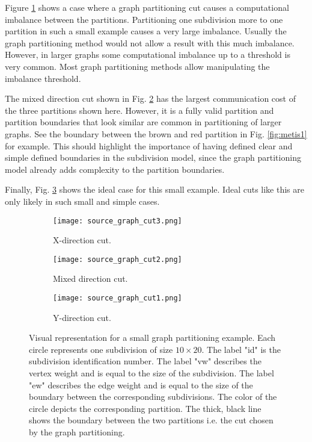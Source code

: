 Figure \ref{fig:cut1} shows a case where a graph partitioning cut causes a computational imbalance between the partitions.
Partitioning one subdivision more to one partition in such a small example causes a very large imbalance.
Usually the graph partitioning method would not allow a result with this much imbalance.
However, in larger graphs some computational imbalance up to a threshold is very common.
Most graph partitioning methods allow manipulating the imbalance threshold.

The mixed direction cut shown in Fig. \ref{fig:cut2} has the largest communication cost of the three partitions shown here.
However, it is a fully valid partition and partition boundaries that look similar are common in partitioning of larger graphs.
See the boundary between the brown and red partition in Fig. \ref{fig:metis1} for example.
This should highlight the importance of having defined clear and simple defined boundaries in the subdivision model, since the graph partitioning model already adds complexity to the partition boundaries.

Finally, Fig. \ref{fig:cut3} shows the ideal case for this small example.
Ideal cuts like this are only likely in such small and simple cases.

\begin{figure}[!htbp]
\centering
\begin{subfigure}{0.43\textwidth}
  \centering
  \texttt{[image: source\_graph\_cut3.png]}
  \caption{X-direction cut.}
  \label{fig:cut1}
\end{subfigure}%

\begin{subfigure}{0.43\textwidth}
  \centering
  \texttt{[image: source\_graph\_cut2.png]}
  \caption{Mixed direction cut.}
  \label{fig:cut2}
\end{subfigure}%

\begin{subfigure}{0.43\textwidth}
  \centering
  \texttt{[image: source\_graph\_cut1.png]}
  \caption{Y-direction cut.}
  \label{fig:cut3}
\end{subfigure}\hfill
\caption{Visual representation for a small graph partitioning example.
Each circle represents one subdivision of size $10 \times 20$.
The label "id" is the subdivision identification number.
The label "vw" describes the vertex weight and is equal to the size of the subdivision.
The label "ew" describes the edge weight and is equal to the size of the boundary between the corresponding subdivisions.
The color of the circle depicts the corresponding partition.
The thick, black line shows the boundary between the two partitions i.e. the cut chosen by the graph partitioning.}
\label{fig:sourcegraph}
\end{figure}

